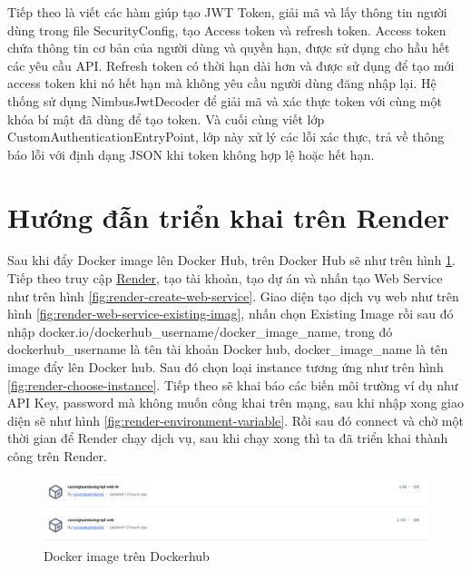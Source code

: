 \documentclass[../BTL.tex]{subfiles}
\begin{document}
Tiếp theo là viết các hàm giúp tạo JWT Token, giải mã và lấy thông tin người dùng trong file SecurityConfig, tạo Access token và refresh token. Access token chứa thông tin cơ bản của người dùng và quyền hạn, được sử dụng cho hầu hết các yêu cầu API. Refresh token có thời hạn dài hơn và được sử dụng để tạo mới access token khi nó hết hạn mà không yêu cầu người dùng đăng nhập lại. Hệ thống sử dụng NimbusJwtDecoder để giải mã và xác thực token với cùng một khóa bí mật đã dùng để tạo token. Và cuối cùng viết lớp CustomAuthenticationEntryPoint, lớp này xử lý các lỗi xác thực, trả về thông báo lỗi với định dạng JSON khi token không hợp lệ hoặc hết hạn.
\section{ Hướng đẫn triển khai trên Render}
Sau khi đẩy Docker image lên Docker Hub, trên Docker Hub sẽ như trên hình \ref{fig:dockerhub}. Tiếp theo truy cập \href{https://dashboard.render.com/}{Render}, tạo tài khoản, tạo dự án và nhấn tạo Web Service như trên hình \ref{fig:render-create-web-service}. Giao diện tạo dịch vụ web như trên hình \ref{fig:render-web-service-existing-imag}, nhấn chọn Existing Image rồi sau đó nhập docker.io/dockerhub\_username/docker\_image\_name, trong đó dockerhub\_username là tên tài khoản Docker hub, docker\_image\_name là tên image đẩy lên Docker hub. Sau đó chọn loại instance tương ứng như trên hình \ref{fig:render-choose-instance}. Tiếp theo sẽ khai báo các biến môi trường ví dụ như API Key, password mà không muốn công khai trên mạng, sau khi nhập xong giao diện sẽ như hình \ref{fig:render-environment-variable}. Rồi sau đó connect và chờ một thời gian để Render chạy dịch vụ, sau khi chạy xong thì ta đã triển khai thành công trên Render.

\begin{figure}
    \centering
    \includegraphics[width=1\linewidth]{Hinhve/dockerhub.png}
    \caption{Docker image trên Dockerhub}
    \label{fig:dockerhub}
\end{figure}
\end{document}
